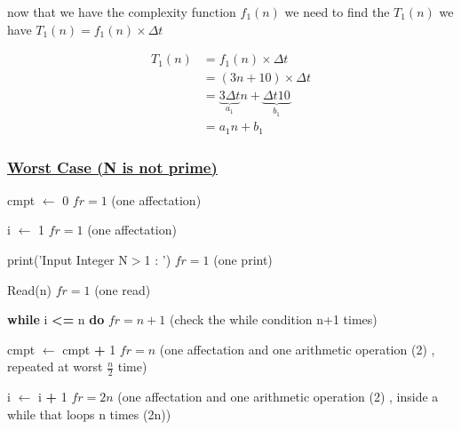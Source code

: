 \vspace{0.5cm}
now that we have the complexity function \(f_1(n)\) we need to find the \(T_1(n)\)  we have \(T_1(n) = f_1(n) \times \Delta t\)

\begin{align*}
T_1(n) &= f_1(n) \times \Delta t\\ 
&= (3n + 10) \times \Delta t \\
&= \underbrace{3 \Delta t}_{a_1} n + \underbrace{\Delta t 10}_{b_1} \\
&= \boxed{a_1n+b_1} 
\end{align*}

\subsubsection*{\underline{Worst Case (N is not prime)}}

\vspace{0.5cm}
cmpt $\gets$ 0  \hspace{4cm} \(fr = 1\) (one affectation)

\vspace{0.15cm}
i $\gets$ 1  \hspace{4.65cm} \(fr = 1\) (one affectation)

\vspace{0.15cm}
\textcolor{purplePlot!80!black}{print}(\textcolor{blueArea!60!black}{'Input Integer N\(>\)1 : '})  \hspace{0.95cm} \(fr = 1\) (one print)

\vspace{0.15cm}
\textcolor{purplePlot!80!black}{Read}(n)  \hspace{4.25cm} \(fr = 1\) (one read)

\vspace{0.15cm}

\textbf{while} i \textcolor{redPlot}{\textbf{\textless=}} n  \textbf{do} \hspace{2.75cm} \(fr = n+1\) (check the while condition n+1 times)


\vspace{0.15cm}
cmpt $\gets$ cmpt \textcolor{redPlot}{ \textbf{+}} 1 \hspace{2.6cm} \(fr = n\) (one affectation and one arithmetic operation (2) ,  repeated at worst \(\frac{n}{2}\) time)

\vspace{0.15cm}
i $\gets$ i \textcolor{redPlot}{ \textbf{+}} 1 \hspace{4cm} \(fr = 2n\) (one affectation and one arithmetic operation (2) ,  inside a while that loops n times (2n))

